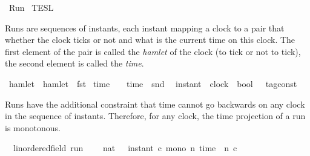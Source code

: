 %
\begin{isabellebody}%
%
%
\isadelimdocument
%
\endisadelimdocument
%
\isatagdocument
%
\isamarkuptrue%
%
\endisatagdocument
{\isafolddocument}%
%
\isadelimdocument
%
\endisadelimdocument
%
\isadelimtheory
%
\endisadelimtheory
%
\isatagtheory
{}\isamarkupfalse%
\ Run\isanewline
{}\ TESL\isanewline
\ \ \ \ \ \ \isanewline
{}%
\endisatagtheory
{\isafoldtheory}%
%
\isadelimtheory
%
\endisadelimtheory
%
\begin{isamarkuptext}%
Runs are sequences of instants, each instant mapping a clock to a pair that whether the clock 
  ticks or not and what is the current time on this clock. The first element of the pair is
  called the \emph{hamlet} of the clock (to tick or not to tick), the second element is called the 
  \emph{time}.%
\end{isamarkuptext}\isamarkuptrue%
\isamarkupfalse%
\ hamlet\ \ {\isacartoucheopen}hamlet\ {\isasymequiv}\ fst{\isacartoucheclose}\isanewline
{}\isamarkupfalse%
\ time\ \ \ \ {\isacartoucheopen}time\ {\isasymequiv}\ snd{\isacartoucheclose}\isanewline
\isanewline
{}\isamarkupfalse%
\ {\isacharprime}{\isasymtau}\ instant\ {\isacharequal}\ {\isacartoucheopen}clock\ {\isasymRightarrow}\ {\isacharparenleft}bool\ {\isasymtimes}\ {\isacharprime}{\isasymtau}\ tag{\isacharunderscore}const{\isacharparenright}{\isacartoucheclose}%
\begin{isamarkuptext}%
Runs have the additional constraint that time cannot go backwards on any clock in the sequence 
  of instants. Therefore, for any clock, the time projection of a run is monotonous.%
\end{isamarkuptext}\isamarkuptrue%
\isamarkupfalse%
\ {\isacharparenleft}\ {\isacharprime}{\isasymtau}{\isacharcolon}{\isacharcolon}linordered{\isacharunderscore}field\ run\ {\isacharequal}\isanewline
\ \ {\isacartoucheopen}{\isacharbraceleft}\ {\isasymrho}{\isacharcolon}{\isacharcolon}nat\ {\isasymRightarrow}\ {\isacharprime}{\isasymtau}\ instant{\isachardot}\ {\isasymforall}c{\isachardot}\ mono\ {\isacharparenleft}{\isasymlambda}n{\isachardot}\ time\ {\isacharparenleft}{\isasymrho}\ n\ c{\isacharparenright}{\isacharparenright}\ {\isacharbraceright}{\isacartoucheclose}\isanewline
%
\isadelimproof
%
\endisadelimproof
%
\isatagproof

\end{isabellebody}
